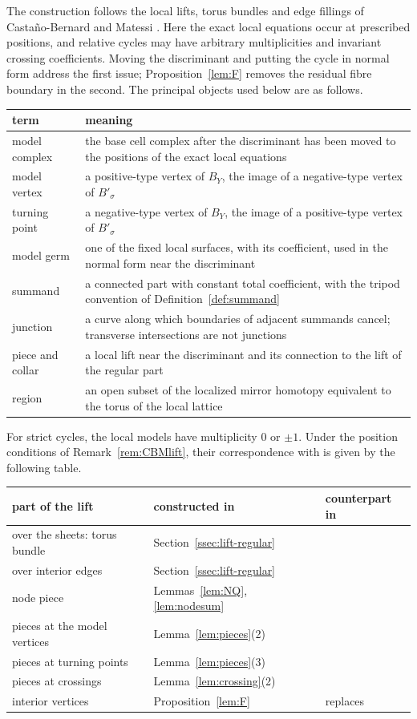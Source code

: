 The construction follows the local lifts, torus bundles and edge fillings of Casta\~no-Bernard and Matessi
\cite[\S7]{CBM}. Here the exact local equations occur at prescribed positions, and relative cycles may have arbitrary
multiplicities and invariant crossing coefficients. Moving the discriminant and putting the cycle in normal form
address the first issue; Proposition~\ref{lem:F} removes the residual fibre boundary in the second.
The principal objects used below are as follows.
{\small\begin{longtable}{p{3cm}p{10cm}}
term & meaning\\\hline
model complex & the base cell complex after the discriminant has been moved to the positions of the exact local equations\\
model vertex & a positive-type vertex of $B_Y$, the image of a negative-type vertex of $B'_\sigma$\\
turning point & a negative-type vertex of $B_Y$, the image of a positive-type vertex of $B'_\sigma$\\
model germ & one of the fixed local surfaces, with its coefficient, used in the normal form near the discriminant\\
summand & a connected part with constant total coefficient, with the tripod convention of Definition~\ref{def:summand}\\
junction & a curve along which boundaries of adjacent summands cancel; transverse intersections are not junctions\\
piece and collar & a local lift near the discriminant and its connection to the lift of the regular part\\
region & an open subset of the localized mirror homotopy equivalent to the torus of the local lattice
\end{longtable}}
For strict cycles, the local models have multiplicity $0$ or $\pm1$. Under the position conditions of
Remark~\ref{rem:CBMlift}, their correspondence with \cite{CBM} is given by the following table.
\begin{center}\small
\begin{tabular}{p{5.2cm}p{4.3cm}p{4.6cm}}
part of the lift & constructed in & counterpart in \cite{CBM}\\\hline
over the sheets: torus bundle & Section~\ref{ssec:lift-regular} & \cite[\S7, (46)]{CBM}\\
over interior edges & Section~\ref{ssec:lift-regular} & \cite[\S7.7, Step~2]{CBM}\\
node piece & Lemmas~\ref{lem:NQ}, \ref{lem:nodesum} & \cite[Lemma~5.14]{CBM}\\
pieces at the model vertices & Lemma~\ref{lem:pieces}(2) & \cite[\S7.5; \S7.7, Steps~2--3]{CBM}\\
pieces at turning points & Lemma~\ref{lem:pieces}(3) & \cite[Lemma~7.6]{CBM}\\
pieces at crossings & Lemma~\ref{lem:crossing}(2) & \cite[\S7.7, Step~6]{CBM}\\
interior vertices & Proposition~\ref{lem:F} & replaces \cite[\S7.7, Step~5]{CBM}
\end{tabular}
\end{center}


